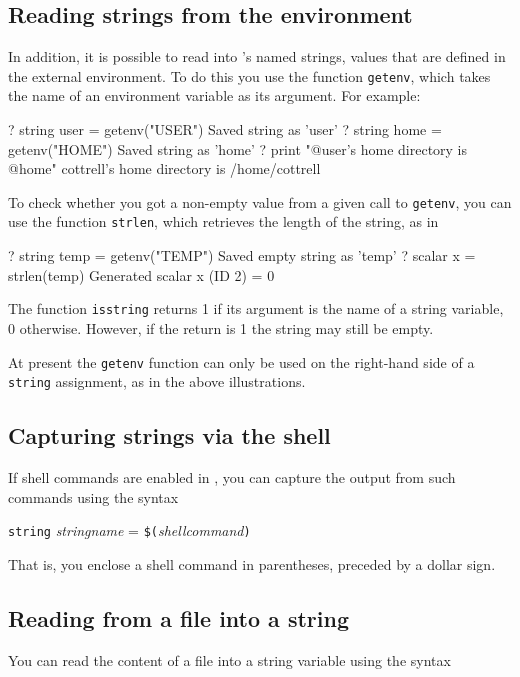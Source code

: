 \subsection{Reading strings from the environment}

In addition, it is possible to read into 's named strings,
values that are defined in the external environment.  To do this you
use the function \texttt{getenv}, which takes the name of an environment
variable as its argument.  For example:
%
\begin{code}
? string user = getenv("USER")
Saved string as 'user'
? string home = getenv("HOME")
Saved string as 'home'
? print "@user's home directory is @home"
cottrell's home directory is /home/cottrell
\end{code}
%
To check whether you got a non-empty value from a given call to
\texttt{getenv}, you can use the function \texttt{strlen}, which
retrieves the length of the string, as in
%
\begin{code}
? string temp = getenv("TEMP")
Saved empty string as 'temp'
? scalar x = strlen(temp)
Generated scalar x (ID 2) = 0
\end{code}

The function \texttt{isstring} returns 1 if its argument is the name
of a string variable, 0 otherwise.  However, if the return is 1
the string may still be empty.

At present the \texttt{getenv} function can only be used on the
right-hand side of a \texttt{string} assignment, as in the above
illustrations.

\subsection{Capturing strings via the shell}

If shell commands are enabled in , you can capture the
output from such commands using the syntax 

\texttt{string} \textsl{stringname} = \texttt{\$(}\textsl{shellcommand}\texttt{)}

That is, you enclose a shell command in parentheses, preceded by
a dollar sign.

\subsection{Reading from a file into a string}

You can read the content of a file into a string variable using
the syntax

